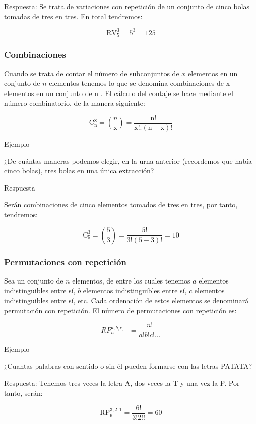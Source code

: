 \documentclass[
]{article}
\begin{document}
Respuesta: Se trata de variaciones con repetición de un conjunto de
cinco bolas tomadas de tres en tres. En total tendremos:

\[
\mathrm{RV}_{5}^{3}=5^{3}=125
\]

\subsubsection{Combinaciones}\label{combinaciones}

Cuando se trata de contar el número de subconjuntos de \(x\) elementos en un conjunto de \(n\) elementos tenemos lo que se denomina combinaciones de
x elementos en un conjunto de n . El cálculo del contaje se hace
mediante el número combinatorio, de la manera siguiente:

\[
\mathrm{C}_{\mathrm{n}}^{\mathrm{x}}=\binom{n}{\mathrm{x}}=\frac{\mathrm{n!}}{\mathrm{x}!.(\mathrm{n}-\mathrm{x})!}
\]

Ejemplo

¿De cuántas maneras podemos elegir, en la urna anterior (recordemos que
había cinco bolas), tres bolas en una única extracción?

Respuesta

Serán combinaciones de cinco elementos tomados de tres en tres, por
tanto, tendremos:

\[
\mathrm{C}_{5}^{3}=\binom{5}{3}=\frac{5!}{3!(5-3)!}=10
\]

\subsubsection{Permutaciones con repetición}\label{permutaciones-con-repeticiuxf3n}

Sea un conjunto de \(n\) elementos, de entre los cuales tenemos \(a\)
elementos indistinguibles entre sí, \(b\) elementos indistinguibles entre
sí, \(c\) elementos indistinguibles entre sí, etc. Cada ordenación de
estos elementos se denominará permutación con repetición. El número de
permutaciones con repetición es:

\[
R P{ }_{n}^{a, b, c, \ldots}=\frac{n!}{a!b!c!\ldots}
\]

Ejemplo

¿Cuantas palabras con sentido o sin él pueden formarse con las letras
PATATA?

Respuesta: Tenemos tres veces la letra A, dos veces la T y una vez la P.
Por tanto, serán:

\[
\mathrm{RP}_{6}^{3,2,1}=\frac{6!}{3!2!!}=60
\]
\end{document}

